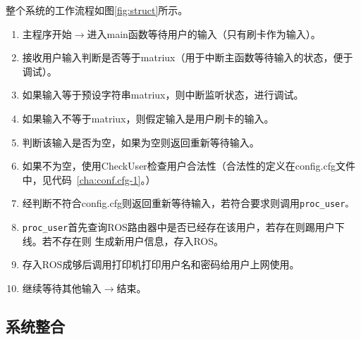 整个系统的工作流程如图\ref{fig:struct}所示。
\begin{enumerate}
\item 主程序开始$\rightarrow$进入main函数等待用户的输入（只有刷卡作为输入）。
\item 接收用户输入判断是否等于matriux（用于中断主函数等待输入的状态，便于调试）。
\item 如果输入等于预设字符串matriux，则中断监听状态，进行调试。
\item 如果输入不等于matriux，则假定输入是用户刷卡的输入。
\item 判断该输入是否为空，如果为空则返回重新等待输入。
\item 如果不为空，使用CheckUser检查用户合法性（合法性的定义在config.cfg文件中，见代码~\ref{cha:conf.cfg-1}。）
\item 经判断不符合config.cfg则返回重新等待输入，若符合要求则调用\verb|proc_user。|
\item \verb|proc_user|首先查询ROS路由器中是否已经存在该用户，若存在则踢用户下线。若不存在则
  生成新用户信息，存入ROS。
\item 存入ROS成够后调用打印机打印用户名和密码给用户上网使用。
\item 继续等待其他输入$\rightarrow$结束。
\end{enumerate}

\subsection{系统整合}

